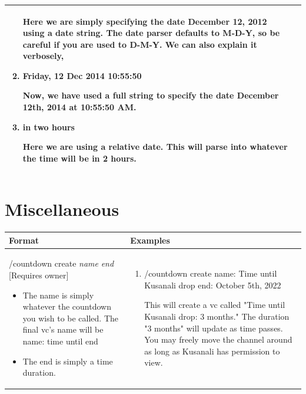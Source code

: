 \documentclass{scrartcl}
\begin{document}
\begin{tabularx}{\textwidth}{|>{\raggedright\arraybackslash}X|>{\raggedright\arraybackslash}X|}
\begin{enumerate}
    Here we are simply specifying the date December 12, 2012 using a date string. The date parser defaults to M-D-Y, so be careful if you are used to D-M-Y. We can also explain it verbosely,
    
    \item Friday, 12 Dec 2014 10:55:50
    
     Now, we have used a full string to specify the date December 12th, 2014 at 10:55:50 AM.
    \item in two hours
    
    Here we are using a relative date. This will parse into whatever the time will be in 2 hours.
    
\end{enumerate}\\
\hline
\end{tabularx}
\newpage
\section{Miscellaneous}
\begin{tabularx}{\textwidth}{|>{\raggedright\arraybackslash}X|>{\raggedright\arraybackslash}X|}
\hline
Format & Examples \\
\hline
/countdown create \textit{name} \textit{end} [Requires owner]
\begin{itemize}
    \item The name is simply whatever the countdown you wish to be called. The final vc's name will be {name}: {time until end}
    \item The end is simply a time duration. 
\end{itemize}&
\begin{enumerate}
    \item /countdown create name: \color{gray} Time until Kusanali drop \color{black} end: \color{gray} October 5th, 2022 \color{black}
    
    This will create a vc called "Time until Kusanali drop: 3 months." The duration "3 months" will update as time passes. You may freely move the channel around as long as Kusanali has permission to view. 
    
\end{enumerate}\\
\hline
\end{tabularx}
\end{document}
